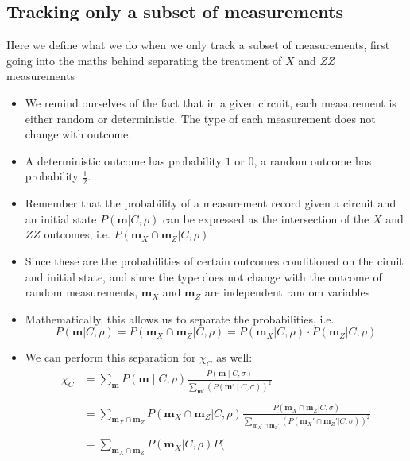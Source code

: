 \subsection{Tracking only a subset of measurements}
\label{sec:lxe-indep}
Here we define what we do when we only track a subset of measurements, first
going into the maths behind separating the treatment of $X$ and $ZZ$
measurements
\begin{itemize}
  \item We remind ourselves of the fact that in a given circuit, each
    measurement is either random or deterministic. The type of each measurement
    does not change with outcome.
  \item A deterministic outcome has probability $1$ or $0$, a random outcome has
    probability $\frac{1}{2}$.
  \item Remember that the probability of a measurement record given a circuit
    and an initial state $P(\mathbf{m} | C, \rho)$ can be expressed as the
    intersection of the $X$ and $ZZ$ outcomes, i.e. $P(\mathbf{m}_X \cap
    \mathbf{m}_Z | C, \rho)$
  \item Since these are the probabilities of certain outcomes conditioned on
    the ciruit and initial state, and since the type does not change with the outcome
    of random measurements, $\mathbf{m}_X$ and $\mathbf{m}_Z$ are independent random
    variables
  \item Mathematically, this allows us to separate the probabilities, i.e. \[
      P(\mathbf{m} | C, \rho) = P(\mathbf{m}_X \cap \mathbf{m}_Z | C, \rho) =
    P(\mathbf{m}_X | C, \rho)\cdot P(\mathbf{m}_Z | C, \rho) \]
  \item We can perform this separation for $\chi_C$ as well:
    \begin{align}
      \label{eq:lxe-subset}
      \chi_C &= \sum_{\mathbf{m}} P(\mathbf{m} \mid C, \rho) \frac{P(\mathbf{m} \mid
      C, \sigma)}{\sum_{\mathbf{m}'}\left(P(\mathbf{m}' \mid
      C, \sigma)\right)^2} \nonumber\\
      \nonumber\\
      &= \sum_{\mathbf{m}_X \cap \mathbf{m}_Z} P(\mathbf{m}_X \cap \mathbf{m}_Z |
        C, \rho) \frac{P(\mathbf{m}_X \cap \mathbf{m}_Z| C,
        \sigma)}{\sum_{\mathbf{m}_X' \cap \mathbf{m}_Z'} \left(P(\mathbf{m}_X' \cap
        \mathbf{m}_Z'|C,\sigma)\right)^2}\nonumber\\
        \nonumber\\
      &= \sum_{\mathbf{m}_X \cap \mathbf{m}_Z} P(\mathbf{m}_X | C, \rho) P(

\end{align}
\end{itemize}
